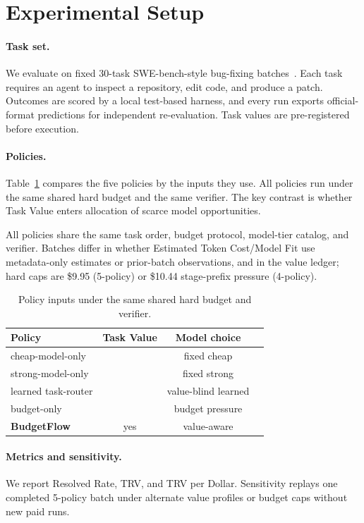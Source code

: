 \documentclass[letterpaper]{article}
\newcommand{\method}{BudgetFlow\xspace}
\newcommand{\trv}{TRV\xspace}
\newcommand{\taskvalue}{Task Value\xspace}
\newcommand{\tokencost}{Estimated Token Cost\xspace}
\newcommand{\modelfit}{Model Fit\xspace}
\begin{document}
\section{Experimental Setup}
\label{sec:setup}
\paragraph{Task set.}
We evaluate on fixed 30-task SWE-bench-style bug-fixing batches~\cite{swebench}. Each task requires an agent to inspect a repository, edit code, and produce a patch. Outcomes are scored by a local test-based harness, and every run exports official-format predictions for independent re-evaluation. Task values are pre-registered before execution.

\paragraph{Policies.}
Table~\ref{tab:policies} compares the five policies by the inputs they use. All policies run under the same shared hard budget and the same verifier. The key contrast is whether \taskvalue enters allocation of scarce model opportunities.

All policies share the same task order, budget protocol, model-tier catalog, and verifier. Batches differ in whether \tokencost/\modelfit use metadata-only estimates or prior-batch observations, and in the value ledger; hard caps are \$9.95 (5-policy) or \$10.44 stage-prefix pressure (4-policy).

\begin{table}[t]
\centering
\small
\begin{tabular}{lccc}
\toprule
Policy & Task Value & Model choice \\
\midrule
cheap-model-only &  & fixed cheap \\
strong-model-only &  & fixed strong \\
learned task-router &  & value-blind learned \\
budget-only &  & budget pressure \\
\textbf{\method} & yes & value-aware \\
\bottomrule
\end{tabular}
\caption{Policy inputs under the same shared hard budget and verifier.}
\label{tab:policies}
\end{table}

\paragraph{Metrics and sensitivity.}
We report Resolved Rate, \trv, and \trv per Dollar. Sensitivity replays one completed 5-policy batch under alternate value profiles or budget caps without new paid runs.
\end{document}
